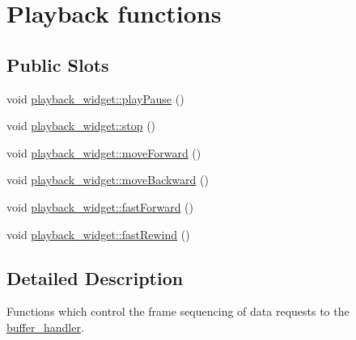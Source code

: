 \hypertarget{group__playback}{\section{Playback functions}
\label{group__playback}
}
\subsection*{Public Slots}
\begin{DoxyCompactItemize}
\item 
void \hyperlink{group__playback_ga29ce224165d692b1747805631445559d}{playback\+\_\+widget\+::play\+Pause} ()
\item 
void \hyperlink{group__playback_gac7dc7d508c0369527e824690b855bedb}{playback\+\_\+widget\+::stop} ()
\item 
void \hyperlink{group__playback_gae6c7dc764a8923173ba073a439e6c1d0}{playback\+\_\+widget\+::move\+Forward} ()
\item 
void \hyperlink{group__playback_gaaac6b8a27b81f2d431840f8ffa8f7c72}{playback\+\_\+widget\+::move\+Backward} ()
\item 
void \hyperlink{group__playback_gaef6f962616f5e88be9dd73d08201eee3}{playback\+\_\+widget\+::fast\+Forward} ()
\item 
void \hyperlink{group__playback_ga852358db15af739882adc86c17383152}{playback\+\_\+widget\+::fast\+Rewind} ()
\end{DoxyCompactItemize}


\subsection{Detailed Description}
Functions which control the frame sequencing of data requests to the \hyperlink{classbuffer__handler}{buffer\+\_\+handler}. 

